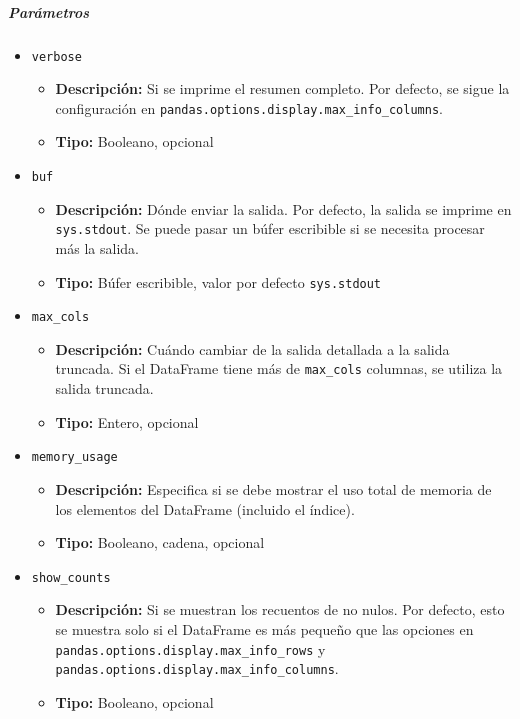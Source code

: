 \subparagraph{\textbf{Parámetros}}
\begin{itemize}
    \item \texttt{verbose}
          \begin{itemize}
              \item \textbf{Descripción:} Si se imprime el resumen completo.
                    Por defecto, se sigue la configuración en
                    \texttt{pandas.options.display.max\_info\_columns}.
              \item \textbf{Tipo:} Booleano, opcional
          \end{itemize}
    \item \texttt{buf}
          \begin{itemize}
              \item \textbf{Descripción:} Dónde enviar la salida. Por defecto,
                    la salida se imprime en \texttt{sys.stdout}. Se puede pasar un búfer escribible
                    si se necesita procesar más la salida.
              \item \textbf{Tipo:} Búfer escribible, valor por defecto
                    \texttt{sys.stdout}
          \end{itemize}
    \item \texttt{max\_cols}
          \begin{itemize}
              \item \textbf{Descripción:} Cuándo cambiar de la salida detallada
                    a la salida truncada. Si el DataFrame tiene más de \texttt{max\_cols} columnas,
                    se utiliza la salida truncada.
              \item \textbf{Tipo:} Entero, opcional
          \end{itemize}
    \item \texttt{memory\_usage}
          \begin{itemize}
              \item \textbf{Descripción:} Especifica si se debe mostrar el uso
                    total de memoria de los elementos del DataFrame (incluido el índice).
              \item \textbf{Tipo:} Booleano, cadena, opcional
          \end{itemize}
    \item \texttt{show\_counts}
          \begin{itemize}
              \item \textbf{Descripción:} Si se muestran los recuentos de no
                    nulos. Por defecto, esto se muestra solo si el DataFrame es más pequeño que las
                    opciones en \texttt{pandas.options.display.max\_info\_rows} y
                    \texttt{pandas.options.display.max\_info\_columns}.
              \item \textbf{Tipo:} Booleano, opcional
          \end{itemize}
\end{itemize}


